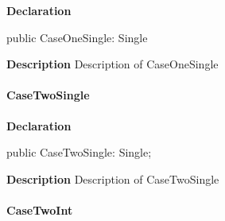 \documentclass{report}
\begin{document}
\begin{list}{}{
\setlength{\itemindent}{0cm}
\setlength{\listparindent}{0cm}
\setlength{\leftmargin}{\evensidemargin}
\addtolength{\leftmargin}{\tmplength}
\settowidth{\labelsep}{X}
\addtolength{\leftmargin}{\labelsep}
\setlength{\labelwidth}{\tmplength}
}
\begin{flushleft}
\item[\textbf{Declaration}\hfill]
\begin{ttfamily}
public CaseOneSingle: Single\end{ttfamily}


\end{flushleft}
\par
\item[\textbf{Description}]
Description of CaseOneSingle

\end{list}
\paragraph*{CaseTwoSingle}\hspace*{\fill}

\begin{list}{}{
\setlength{\itemindent}{0cm}
\setlength{\listparindent}{0cm}
\setlength{\leftmargin}{\evensidemargin}
\addtolength{\leftmargin}{\tmplength}
\settowidth{\labelsep}{X}
\addtolength{\leftmargin}{\labelsep}
\setlength{\labelwidth}{\tmplength}
}
\begin{flushleft}
\item[\textbf{Declaration}\hfill]
\begin{ttfamily}
public CaseTwoSingle: Single;\end{ttfamily}


\end{flushleft}
\par
\item[\textbf{Description}]
Description of CaseTwoSingle

\end{list}
\paragraph*{CaseTwoInt}\hspace*{\fill}
\end{document}
